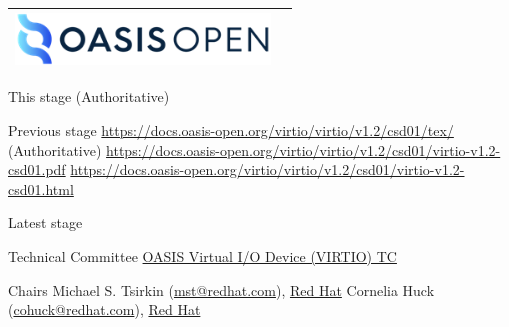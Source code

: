 \begin{titlepage}
\thispagestyle{fancy}

\begin{tabular*}{\textwidth}{@{\extracolsep{\fill}}lr}
	\includegraphics[height=0.55in]{images/oasis.png}\\
	\hline
\end{tabular*}

\oasistitle{\virtioversion}
\oasisstagelabel{\virtiodraftstagename\virtiodraftstageextratitle}
\vspace{0.05in}
\oasisstagelabel{\virtioworkingdraftdate}

\begin{oasistitlesection}{This stage}
\virtiourltex{ }(Authoritative)\newline
\virtiourlpdf\newline
\virtiourlhtml
\end{oasistitlesection}

\begin{oasistitlesection}{Previous stage}
\url{https://docs.oasis-open.org/virtio/virtio/v1.2/csd01/tex/}
{}(Authoritative)\newline
\url{https://docs.oasis-open.org/virtio/virtio/v1.2/csd01/virtio-v1.2-csd01.pdf}\newline
\url{https://docs.oasis-open.org/virtio/virtio/v1.2/csd01/virtio-v1.2-csd01.html}
\end{oasistitlesection}

\begin{oasistitlesection}{Latest stage}
\virtiourllatestpdf\newline
\virtiourllatesthtml
\end{oasistitlesection}

\begin{oasistitlesection}{Technical Committee}
\href{https://www.oasis-open.org/committees/virtio/}{OASIS Virtual I/O Device (VIRTIO) TC}
\end{oasistitlesection}

\label{sec:Chair}
\begin{oasistitlesection}{Chairs}
Michael S. Tsirkin (\href{mailto:mst@redhat.com}{mst@redhat.com}), \href{https://www.redhat.com/}{Red Hat}\newline
Cornelia Huck (\href{mailto:cohuck@redhat.com}{cohuck@redhat.com}), \href{https://www.redhat.com/}{Red Hat}\newline
\end{oasistitlesection}


\end{titlepage}
